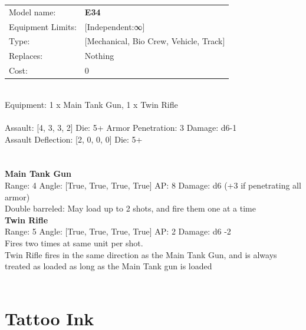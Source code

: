 \noindent
\begin{tabular}{ll}
Model name: &{\bf E34 } \\
Equipment Limits: &[Independent:∞] \\
Type: &[Mechanical, Bio Crew, Vehicle, Track] \\
Replaces: &Nothing \\
Cost: & 0\\
\end{tabular}
\ \\
Equipment: 1 x Main Tank Gun, 1 x Twin Rifle \\
\ \\
Assault: [4, 3, 3, 2] Die: 5+ Armor Penetration: 3 Damage: d6-1 \\
Assault Deflection: [2, 0, 0, 0] Die: 5+\\
\indent  
\ \\

\ \\
{\bf Main Tank Gun } \\



Range: 4  Angle: [True, True, True, True] AP: 8 Damage: d6 (+3 if penetrating all armor) \\
Double barreled: May load up to 2 shots, and fire them one at a time\\ 




{\bf Twin Rifle } \\



Range: 5  Angle: [True, True, True, True] AP: 2 Damage: d6 -2 \\
Fires two times at same unit per shot.\\Twin Rifle fires in the same direction as the Main Tank Gun, and is always treated as loaded as long as the Main Tank gun is loaded\\ 




 
\ \\













\clearpage

\section{ Tattoo Ink }

